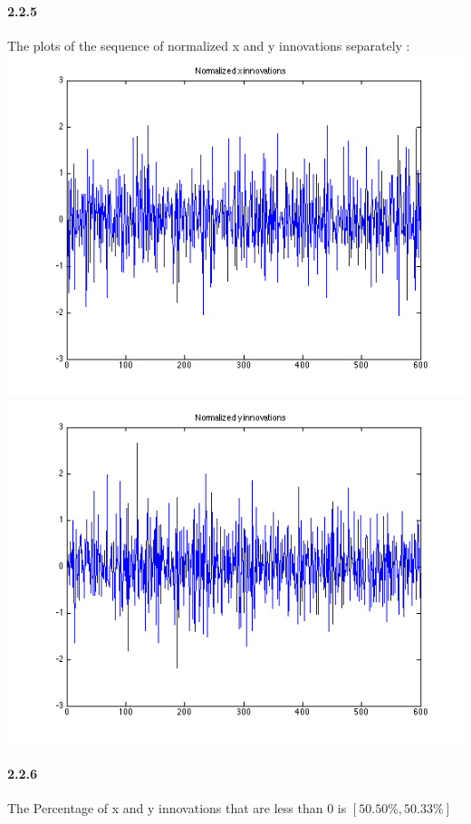 \documentclass[a4paper]{article}
\begin{document}
\paragraph{2.2.5 } The plots of the sequence of normalized x and y innovations separately : \\
\includegraphics[scale=.4]{target_2_x_inno_q_1.png}
\includegraphics[scale=.4]{target_2_y_inno_q_1.png} \\

\paragraph{2.2.6 } The Percentage of x and y innovations that are less than 0 is $[ 50.50\%, 50.33\% ]$ \\
\end{document}
